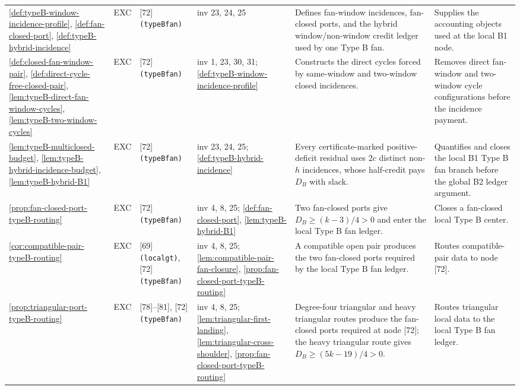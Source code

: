 \documentclass[11pt]{article}
\begin{document}
{\begin{longtable}{L{0.10\textwidth} C{0.045\textwidth} L{0.13\textwidth} L{0.135\textwidth} L{0.28\textwidth} L{0.20\textwidth}}
\cref{def:typeB-window-incidence-profile}, \cref{def:fan-closed-port}, \cref{def:typeB-hybrid-incidence} & EXC & [72] \texttt{(typeBfan)} & inv 23, 24, 25 & Defines fan-window incidences, fan-closed ports, and the hybrid window/non-window credit ledger used by one Type B fan. & Supplies the accounting objects used at the local B1 node. \\
\cref{def:closed-fan-window-pair}, \cref{def:direct-cycle-free-closed-pair}, \cref{lem:typeB-direct-fan-window-cycles}, \cref{lem:typeB-two-window-cycles} & EXC & [72] \texttt{(typeBfan)} & inv 1, 23, 30, 31; \cref{def:typeB-window-incidence-profile} & Constructs the direct cycles forced by same-window and two-window closed incidences. & Removes direct fan-window and two-window cycle configurations before the incidence payment. \\
\cref{lem:typeB-multiclosed-budget}, \cref{lem:typeB-hybrid-incidence-budget}, \cref{lem:typeB-hybrid-B1} & EXC & [72] \texttt{(typeBfan)} & inv 23, 24, 25; \cref{def:typeB-hybrid-incidence} & Every certificate-marked positive-deficit residual uses \(2c\) distinct non-\(h\) incidences, whose half-credit pays \(D_B\) with slack. & Quantifies and closes the local B1 Type B fan branch before the global B2 ledger argument. \\
\cref{prop:fan-closed-port-typeB-routing} & EXC & [72] \texttt{(typeBfan)} & inv 4, 8, 25; \cref{def:fan-closed-port}, \cref{lem:typeB-hybrid-B1} & Two fan-closed ports give \(D_B\ge(k-3)/4>0\) and enter the local Type B fan ledger. & Closes a fan-closed local Type B center. \\
\cref{cor:compatible-pair-typeB-routing} & EXC & [69] \texttt{(localgt)}, [72] \texttt{(typeBfan)} & inv 4, 8, 25; \cref{lem:compatible-pair-fan-closure}, \cref{prop:fan-closed-port-typeB-routing} & A compatible open pair produces the two fan-closed ports required by the local Type B fan ledger. & Routes compatible-pair data to node [72]. \\
\cref{prop:triangular-port-typeB-routing} & EXC & [78]--[81], [72] \texttt{(typeBfan)} & inv 4, 8, 25; \cref{lem:triangular-first-landing}, \cref{lem:triangular-cross-shoulder}, \cref{prop:fan-closed-port-typeB-routing} & Degree-four triangular and heavy triangular routes produce the fan-closed ports required at node [72]; the heavy triangular route gives \(D_B\ge(5k-19)/4>0\). & Routes triangular local data to the local Type B fan ledger. \\

\end{longtable}}
\end{document}
